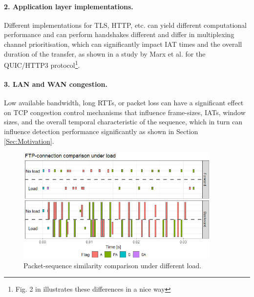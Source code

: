 \documentclass[runningheads]{llncs}
\begin{document}


\paragraph{2. Application layer implementations.}
Different implementations for TLS, HTTP, etc. can yield different computational performance and can perform handshakes different and differ in multiplexing channel prioritisation, which can significantly impact IAT times and the overall duration of the transfer, as shown in a study by Marx et al. \cite{marx2020same} for the QUIC/HTTP3 protocol\footnote{Fig. 2 in \cite{marx2020same} illustrates these differences in a nice way}. 


\paragraph{3. LAN and WAN congestion.}
Low available bandwidth, long RTTs, or packet loss can have a significant effect on TCP congestion control mechanisms that influence frame-sizes, IATs, window sizes, and the overall temporal characteristic of the sequence, which in turn can influence detection performance significantly as shown in Section \ref{Sec:Motivation}.


\begin{figure}
\centering
\includegraphics[width=0.9\textwidth]{images/FTP_load.png}
\caption{Packet-sequence similarity comparison under different load.} %
\label{Fig:FTP_load}
\end{figure}
\end{document}
